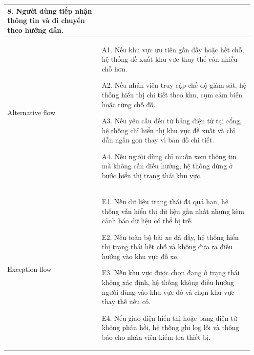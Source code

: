 \begin{center}
\begin{longtable}{|m{2.7cm}|m{12.8cm}|}
8. Người dùng tiếp nhận thông tin và di chuyển theo hướng dẫn.\\
\hline
Alternative flow & 
A1. Nếu khu vực ưu tiên gần đầy hoặc hết chỗ, hệ thống đề xuất khu vực thay thế còn nhiều chỗ hơn.

A2. Nếu nhân viên truy cập chế độ giám sát, hệ thống hiển thị chi tiết theo khu, cụm cảm biến hoặc từng chỗ đỗ.

A3. Nếu yêu cầu đến từ bảng điện tử tại cổng, hệ thống chỉ hiển thị khu vực đề xuất và chỉ dẫn ngắn gọn thay vì bản đồ chi tiết.

A4. Nếu người dùng chỉ muốn xem thông tin mà không cần điều hướng, hệ thống dừng ở bước hiển thị trạng thái khu vực.\\ 
\hline
Exception flow & 
E1. Nếu dữ liệu trạng thái đã quá hạn, hệ thống vẫn hiển thị dữ liệu gần nhất nhưng kèm cảnh báo dữ liệu có thể bị trễ.

E2. Nếu toàn bộ bãi xe đã đầy, hệ thống hiển thị trạng thái hết chỗ và không đưa ra điều hướng vào khu vực đỗ xe.

E3. Nếu khu vực được chọn đang ở trạng thái không xác định, hệ thống không điều hướng người dùng vào khu vực đó và chọn khu vực thay thế nếu có.

E4. Nếu giao diện hiển thị hoặc bảng điện tử không phản hồi, hệ thống ghi log lỗi và thông báo cho nhân viên kiểm tra thiết bị.\\
\hline
\end{longtable}
\end{center}

